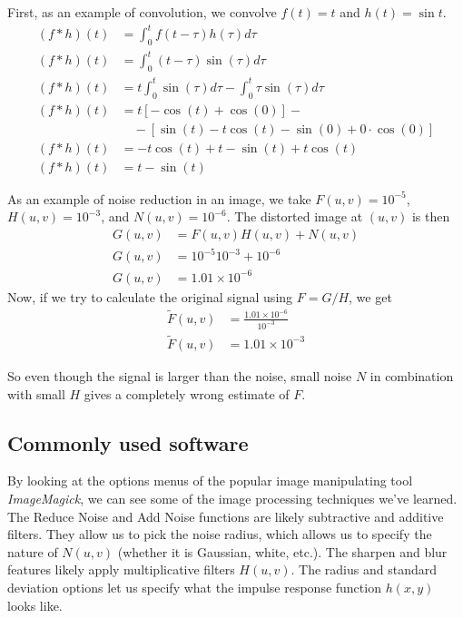 \documentclass[twocolumn]{myarticle}
\begin{document}
First, as an example of convolution, we convolve $ f(t) = t $ and $ h(t) = \sin t $.
\begin{align}
    (f * h)(t) &= \int_{0}^{t} f(t - \tau) h(\tau) d \tau
    \\
    (f * h)(t) &= \int_{0}^{t} (t - \tau) \sin(\tau) d \tau
    \\
    (f * h)(t) &= t \int_{0}^{t} \sin(\tau) d \tau - \int_{0}^{t} \tau \sin (\tau) d \tau
    \\
    (f * h)(t) &= t \left[ -\cos(t) + \cos(0) \right] - 
    \nonumber \\
    &\quad - \left[ \sin(t) - t \cos(t) - \sin(0) + 0 \cdot \cos(0) \right]
    \\
    (f * h)(t) &= - t \cos(t) + t - \sin(t) + t \cos(t)
    \\
    (f * h)(t) &= t - \sin(t)
\end{align}

As an example of noise reduction in an image, we take $ F(u,v) = 10^{-5} $, $ H(u,v) = 10^{-3} $, and $ N(u,v) = 10^{-6} $.
The distorted image at $ (u,v) $ is then
\begin{align}
    G(u,v) &= F(u,v) H(u,v) + N(u,v)
    \\
    G(u,v) &= 10^{-5} 10^{-3} + 10^{-6}
    \\
    G(u,v) &= 1.01 \times 10^{-6}
\end{align}
Now, if we try to calculate the original signal using $ F = G/H $, we get
\begin{align}
    \tilde{F}(u,v) &= \frac{1.01 \times 10^{-6}}{10^{-3}}
    \\
    \tilde{F}(u,v) &= 1.01 \times 10^{-3}
\end{align}

So even though the signal is larger than the noise, small noise $ N $ in combination with small $ H $ gives a completely wrong estimate of $ F $.

\subsection{Commonly used software}
\label{subsec:commonly_used_software}

By looking at the options menus of the popular image manipulating tool \emph{ImageMagick}, we can see some of the image processing techniques we've learned.
The Reduce Noise and Add Noise functions are likely subtractive and additive filters.
They allow us to pick the noise radius, which allows us to specify the nature of $ N(u,v) $ (whether it is Gaussian, white, etc.).
The sharpen and blur features likely apply multiplicative filters $ H(u,v) $.
The radius and standard deviation options let us specify what the impulse response function $ h(x,y) $ looks like.
\end{document}
